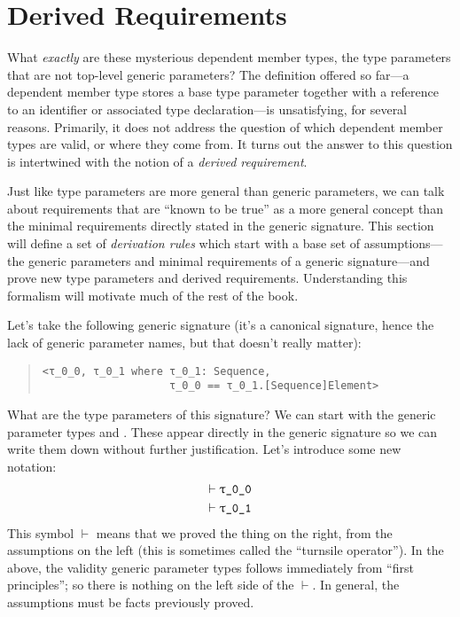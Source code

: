 \documentclass[../generics]{subfiles}
\begin{document}
\section{Derived Requirements}\label{derived req}

\cite{combinatory}

What \emph{exactly} are these mysterious dependent member types, the type parameters that are not top-level generic parameters? The definition offered so far---a dependent member type stores a base type parameter together with a reference to an identifier or associated type declaration---is unsatisfying, for several reasons. Primarily, it does not address the question of which dependent member types are valid, or where they come from. It turns out the answer to this question is intertwined with the notion of a \emph{derived requirement}.

Just like type parameters are more general than generic parameters, we can talk about requirements that are ``known to be true'' as a more general concept than the minimal requirements directly stated in the generic signature. This section will define a set of \emph{derivation rules} which start with a base set of assumptions---the generic parameters and minimal requirements of a generic signature---and prove new type parameters and derived requirements. Understanding this formalism will motivate much of the rest of the book.

Let's take the following generic signature (it's a canonical signature, hence the lack of generic parameter names, but that doesn't really matter):
\begin{quote}
\begin{verbatim}
<τ_0_0, τ_0_1 where τ_0_1: Sequence,
                    τ_0_0 == τ_0_1.[Sequence]Element>
\end{verbatim}
\end{quote}
What are the type parameters of this signature? We can start with the generic parameter types  and . These appear directly in the generic signature so we can write them down without further justification. Let's introduce some new notation:
\begin{gather*}
\vdash\texttt{$\uptau$\_0\_0}\\
\vdash\texttt{$\uptau$\_0\_1}
\end{gather*}
This symbol \index{$\vdash$}$\vdash$ means that we proved the thing on the right, from the assumptions on the left (this is sometimes called the ``turnsile operator''). In the above, the validity generic parameter types follows immediately from ``first principles''; so there is nothing on the left side of the $\vdash$. In general, the assumptions must be facts previously proved.
\end{document}

